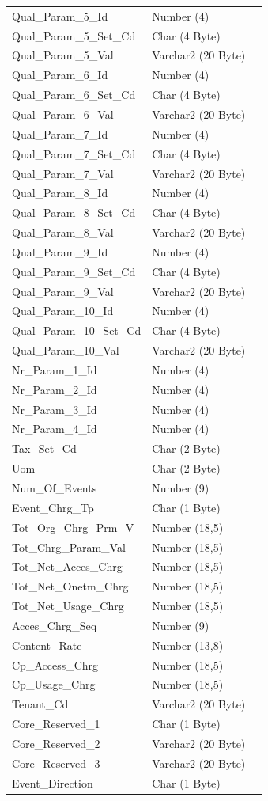 \documentclass[12pt,twoside]{article}
\begin{document}
\begin{longtable}{l|l|l}
Qual\_Param\_5\_Id & Number (4) & \\
Qual\_Param\_5\_Set\_Cd & Char (4 Byte) & \\
Qual\_Param\_5\_Val & Varchar2 (20 Byte) & \\
Qual\_Param\_6\_Id & Number (4) & \\
Qual\_Param\_6\_Set\_Cd & Char (4 Byte) & \\
Qual\_Param\_6\_Val & Varchar2 (20 Byte) & \\
Qual\_Param\_7\_Id & Number (4) & \\
Qual\_Param\_7\_Set\_Cd & Char (4 Byte) & \\
Qual\_Param\_7\_Val & Varchar2 (20 Byte) & \\
Qual\_Param\_8\_Id & Number (4) & \\
Qual\_Param\_8\_Set\_Cd & Char (4 Byte) & \\
Qual\_Param\_8\_Val & Varchar2 (20 Byte) & \\
Qual\_Param\_9\_Id & Number (4) & \\
Qual\_Param\_9\_Set\_Cd & Char (4 Byte) & \\
Qual\_Param\_9\_Val & Varchar2 (20 Byte) & \\
Qual\_Param\_10\_Id & Number (4) & \\
Qual\_Param\_10\_Set\_Cd & Char (4 Byte) & \\
Qual\_Param\_10\_Val & Varchar2 (20 Byte) & \\
Nr\_Param\_1\_Id & Number (4) & \\
Nr\_Param\_2\_Id & Number (4) & \\
Nr\_Param\_3\_Id & Number (4) & \\
Nr\_Param\_4\_Id & Number (4) & \\
Tax\_Set\_Cd & Char (2 Byte) & \\
Uom & Char (2 Byte) & \\
Num\_Of\_Events & Number (9) & \\
Event\_Chrg\_Tp & Char (1 Byte) & \\
Tot\_Org\_Chrg\_Prm\_V & Number (18,5) & \\
Tot\_Chrg\_Param\_Val & Number (18,5) & \\
Tot\_Net\_Acces\_Chrg & Number (18,5) & \\
Tot\_Net\_Onetm\_Chrg & Number (18,5) & \\
Tot\_Net\_Usage\_Chrg & Number (18,5) & \\
Acces\_Chrg\_Seq & Number (9) & \\
Content\_Rate & Number (13,8) & \\
Cp\_Access\_Chrg & Number (18,5) & \\
Cp\_Usage\_Chrg & Number (18,5) & \\
Tenant\_Cd & Varchar2 (20 Byte) & \\
Core\_Reserved\_1 & Char (1 Byte) & \\
Core\_Reserved\_2 & Varchar2 (20 Byte) & \\
Core\_Reserved\_3 & Varchar2 (20 Byte) & \\
Event\_Direction & Char (1 Byte) & \\
\hline
\end{longtable}
\normalsize
\end{document}
